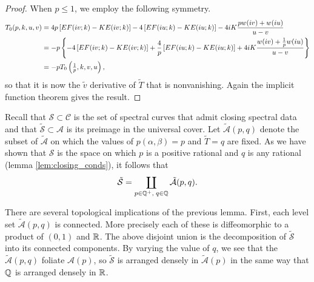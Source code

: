\begin{lem}
\begin{proof}
When $p \leq 1$, we employ the following symmetry.
\begin{align*}
T_0(p,k,u,v)
&= 4p \left[ E F(i v;k) - K E(i v;k) \right] - 4\left[ E F(i u;k) - K E(i u;k) \right] - 4i K \frac{p w(i v) + w(i u)}{u-v} \\
&= -p\left\{ -4\left[ E F(i v;k) - K E(i v;k) \right] + \frac{4}{p}\left[ E F(i u;k) - K E(i u;k) \right] + 4i K \frac{ w(i v) + \frac{1}{p}w(i u)}{u-v} \right\}\\
&= -p T_0\left( \tfrac{1}{p}, k, v, u \right),
\end{align*}
so that it is now the $\tilde{v}$ derivative of $\tilde{T}$ that is nonvanishing. Again the implicit function theorem gives the result.
\end{proof}
\end{lem}

Recall that $\mathcal{S} \subset \mathcal{C}$ is the set of spectral curves that admit closing spectral data and that $\mathcal{\tilde{S}} \subset \mathcal{\mathcal{A}}$ is its preimage in the universal cover. Let $\mathcal{\tilde{A}}(p,q)$ denote the subset of $\mathcal{\tilde{A}}$ on which the values of $p(α,β) = p$ and $\tilde{T} = q$ are fixed. As we have shown that $\mathcal{S}$ is the space on which $p$ is a positive rational and $q$ is any rational (lemma \ref{lem:closing_conds}), it follows that
\[
\mathcal{\tilde{S}} = \coprod_{p\in \mathbb{Q}^+,\; q\in \mathbb{Q}} \mathcal{\tilde{A}}(p,q).
\]

There are several topological implications of the previous lemma. First, each level set $\mathcal{\tilde{A}}(p,q)$ is connected. More precisely each of these is diffeomorphic to a product of $(0,1)$ and $\mathbb{R}$. The above disjoint union is the decomposition of $\mathcal{\tilde{S}}$ into its connected components. By varying the value of $q$, we see that the $\mathcal{\tilde{A}}(p,q)$ foliate $\mathcal{A}(p)$, so $\mathcal{\tilde{S}}$ is arranged densely in $\mathcal{\tilde{A}}(p)$ in the same way that $\mathbb{Q}$ is arranged densely in $\mathbb{R}$.

